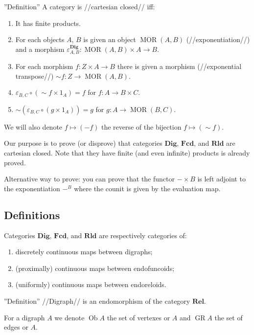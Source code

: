 ''Definition'' A category is //cartesian closed// iff:
\begin{enumerate}
\item It has finite products.
\item For each objects $A$, $B$ is given an object $\operatorname{MOR} ( A , B)$ (//exponentiation//) and a morphism $\varepsilon^{\mathbf{Dig}}_{A, B} : \operatorname{MOR} ( A , B) \times A \rightarrow B$.
\item For each morphism $f : Z \times A \rightarrow B$ there is given a morphism (//exponential transpose//) $\sim f : Z \rightarrow \operatorname{MOR} ( A , B)$.
\item $\varepsilon_{B,C} \circ ( \sim f \times 1_A) = f$ for $f : A \rightarrow B \times C$.
\item $\sim ( \varepsilon_{B,C} \circ ( g \times 1_A)) = g$ for $g : A \rightarrow \operatorname{MOR} ( B , C)$.
\end{enumerate}

We will also denote $f\mapsto (-f)$ the reverse of the bijection $f\mapsto (\sim f)$.

Our purpose is to prove (or disprove) that categories $\mathbf{Dig}$, $\mathbf{Fcd}$, and $\mathbf{Rld}$ are cartesian closed. Note that they have finite (and even infinite) products is already proved.

Alternative way to prove:
you can prove that the functor $-\times B$ is left adjoint to the exponentiation $-^B$ where the counit is given by the evaluation map.

\subsection{Definitions}

Categories $\mathbf{Dig}$, $\mathbf{Fcd}$, and $\mathbf{Rld}$ are respectively categories of:
\begin{enumerate}
\item discretely continuous maps between digraphs;
\item (proximally) continuous maps between endofuncoids;
\item (uniformly) continuous maps between endoreloids.
\end{enumerate}

''Definition'' //Digraph// is an endomorphism of the category $\mathbf{Rel}$.

For a digraph $A$ we denote $\operatorname{Ob} A$ the set of vertexes or $A$ and $\operatorname{GR} A$ the set of edges or $A$.

